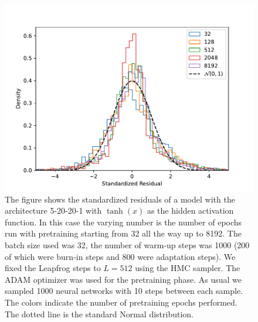 \begin{figure}[H]
    \centering
    \includegraphics[scale=0.7]{figures/standardized_residuals/effect_of_pretraining/standardized_residuals_hmc_vs_pretraining_steps.pdf}
    \caption{The figure shows the standardized residuals of a model with the architecture 5-20-20-1 with $\tanh(x)$ as the
    hidden activation function. In this case the varying number is the number of epochs run with pretraining starting from 32 all the way up to 8192. The batch size used was 32, the number of warm-up steps was 1000 (200 of which were burn-in steps and 800 were adaptation steps). We fixed the Leapfrog steps to $L = 512$ using the HMC sampler. The ADAM optimizer was used for the pretraining phase. As usual we sampled 1000 neural networks with 10 steps between each sample. The colors indicate the number of pretraining epochs performed. The dotted line is the standard Normal distribution.
    }
    \label{fig:std_residual_vs_pretraining}
\end{figure}

